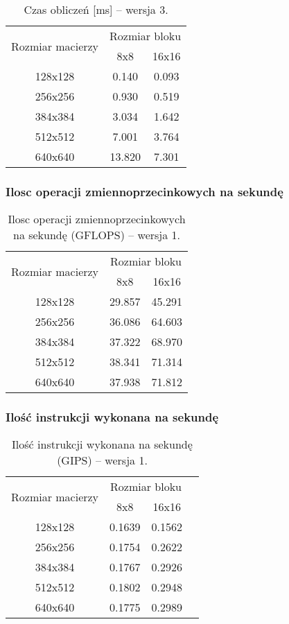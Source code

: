 
\begin{table}[H]
\centering
\begin{tabular}{|c|c|c|}
\hline
\multirow{2}{*}{Rozmiar macierzy} & \multicolumn{2}{c|}{Rozmiar bloku} \\ \cline{2-3}
& 8x8 & 16x16 \\ \hline
128x128 & 0.140 & 0.093 \\ \hline
256x256 & 0.930 & 0.519 \\ \hline
384x384 & 3.034 & 1.642 \\ \hline
512x512 & 7.001 & 3.764 \\ \hline
640x640 & 13.820 & 7.301 \\ \hline
\end{tabular}
\caption{Czas obliczeń [ms] -- wersja 3.}
\end{table}

\subsubsection{Ilosc operacji zmiennoprzecinkowych na sekundę}

\begin{table}[H]
\centering
\begin{tabular}{|c|c|c|}
\hline
\multirow{2}{*}{Rozmiar macierzy} & \multicolumn{2}{c|}{Rozmiar bloku} \\ \cline{2-3}
& 8x8 & 16x16 \\ \hline
128x128 & 29.857 & 45.291 \\ \hline
256x256 & 36.086 & 64.603 \\ \hline
384x384 & 37.322 & 68.970 \\ \hline
512x512 & 38.341 & 71.314 \\ \hline
640x640 & 37.938 & 71.812 \\ \hline
\end{tabular}
\caption{Ilosc operacji zmiennoprzecinkowych na sekundę (GFLOPS) -- wersja 1.}
\end{table}

\subsubsection{Ilość instrukcji wykonana na sekundę}

\begin{table}[H]
\centering
\begin{tabular}{|c|c|c|c|}
\hline
\multirow{2}{*}{Rozmiar macierzy} & \multicolumn{2}{c|}{Rozmiar bloku} \\ \cline{2-3}
& 8x8 & 16x16 \\ \hline
128x128 & 0.1639 & 0.1562 \\ \hline
256x256 & 0.1754 & 0.2622 \\ \hline
384x384 & 0.1767 & 0.2926 \\ \hline
512x512 & 0.1802 & 0.2948 \\ \hline
640x640 & 0.1775 & 0.2989 \\ \hline
\end{tabular}
\caption{Ilość instrukcji wykonana na sekundę (GIPS) -- wersja 1.}
\end{table}

